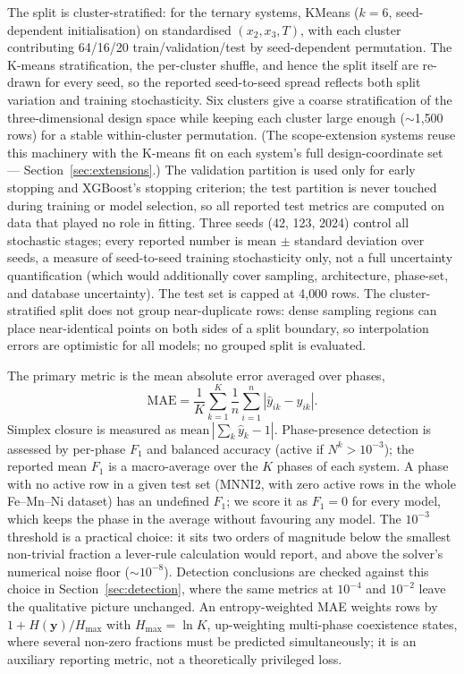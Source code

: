 \documentclass[preprint,12pt,authoryear]{elsarticle}
\newcommand{\Np}[1]{N^{#1}}
\begin{document}
The split is cluster-stratified: for the ternary systems, KMeans
($k = 6$, seed-dependent
initialisation) on standardised $(x_2, x_3, T)$, with each cluster
contributing 64/16/20 train/validation/test by seed-dependent permutation.
The K-means stratification, the per-cluster shuffle, and hence the split
itself are re-drawn for every seed, so the reported seed-to-seed spread
reflects both split variation and training stochasticity.
Six clusters give a coarse stratification of the three-dimensional design
space while keeping each cluster large enough ($\sim$1{,}500 rows) for a
stable within-cluster permutation. (The scope-extension systems reuse this
machinery with the K-means fit on each system's full design-coordinate set
--- Section~\ref{sec:extensions}.) The validation partition is used only
for early stopping and XGBoost's stopping criterion; the test partition is
never touched during training or model selection, so all reported test
metrics are computed on data that played no role in fitting. Three
seeds (42, 123, 2024) control all stochastic stages; every reported number is
mean $\pm$ standard deviation over seeds, a measure of seed-to-seed training
stochasticity only, not a full uncertainty quantification (which would
additionally cover sampling, architecture, phase-set, and database
uncertainty). The test set is capped at 4{,}000
rows. The cluster-stratified split does not group near-duplicate rows:
dense sampling regions can place near-identical points on both sides of a
split boundary, so interpolation errors are optimistic for all models; no
grouped split is evaluated.

The primary metric is the mean absolute error averaged over phases,
\begin{equation}
    \mathrm{MAE} = \frac{1}{K} \sum_{k=1}^{K}
    \frac{1}{n} \sum_{i=1}^{n} |\hat y_{ik} - y_{ik}|.
    \label{eq:mae}
\end{equation}
Simplex closure is measured as $\mathrm{mean}\,|\sum_k \hat y_k - 1|$.
Phase-presence detection is assessed by per-phase $F_1$ and balanced accuracy
(active if $\Np{k} > 10^{-3}$); the reported mean $F_1$ is a macro-average
over the $K$ phases of each system. A phase with no
active row in a given test set (MNNI2, with zero active rows in the whole
Fe--Mn--Ni dataset) has an undefined $F_1$; we score it as $F_1 = 0$ for
every model, which keeps the phase in the average without favouring any
model. The $10^{-3}$
threshold is a practical choice: it sits two orders of magnitude below the
smallest non-trivial fraction a lever-rule calculation would report, and
above the solver's numerical noise floor ($\sim 10^{-8}$). Detection
conclusions are checked against this choice in
Section~\ref{sec:detection}, where the same metrics at $10^{-4}$ and
$10^{-2}$ leave the qualitative picture unchanged. An entropy-weighted MAE
weights rows by $1 + H(\mathbf{y})/H_{\max}$ with $H_{\max} = \ln K$,
up-weighting multi-phase coexistence states, where several non-zero
fractions must be predicted simultaneously; it is an auxiliary reporting
metric, not a theoretically privileged loss.
\end{document}
